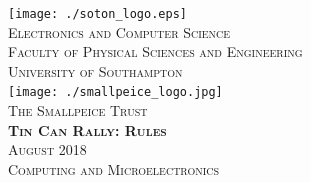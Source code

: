 \documentclass[twoside,12pt,a4paper,titlepage]{article}
\title{\gamename}
\author{\org}
\date{\timeline}
\newcommand{\gamename}{Tin Can Rally\xspace}
\newcommand{\timeline}{August 2018\xspace}
\begin{document}
\begin{titlepage}
\begin{center}
\texttt{[image: ./soton\_logo.eps]}~\\[1cm]
\textsc{\large Electronics and Computer Science}\\[0.2cm]
\textsc{\large Faculty of Physical Sciences and Engineering}\\[0.2cm]
\textsc{\large University of Southampton}\\[3.5cm]
\texttt{[image: ./smallpeice\_logo.jpg]}~\\[1cm]
\textsc{\large The Smallpeice Trust}\\[3.5cm]
\textsc{\huge \textbf{\gamename{}: Rules}}\\[1cm]
\textsc{\large \timeline}\\[3cm]
\textsc{\Large Computing and Microelectronics}
\end{center}
\end{titlepage}


\clearpage

\clearpage

\end{document}
